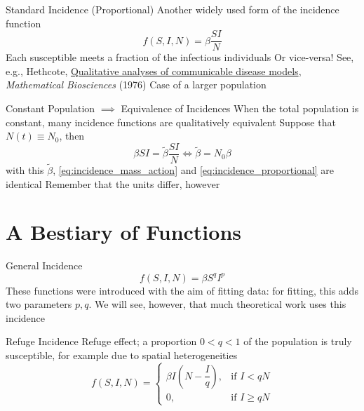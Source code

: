 \documentclass[aspectratio=169]{beamer}\usepackage[]{graphicx}\usepackage[]{xcolor}
\begin{document}
\begin{frame}{Standard Incidence (Proportional)}
\bbullet Another widely used form of the incidence function
\begin{equation}
\tag{3}\label{eq:incidence_proportional}
f(S,I,N)=\beta\frac{SI}{N}
\end{equation}
\bbullet Each susceptible meets a fraction of the infectious individuals
\vfill
\bbullet Or vice-versa! See, e.g., Hethcote, \href{https://doi-org.uml.idm.oclc.org/10.1016/0025-5564(76)90132-2}{Qualitative analyses of communicable disease models}, \emph{Mathematical Biosciences} (1976)
\vfill
\bbullet Case of a larger population
\end{frame}

\begin{frame}{Constant Population $\implies$ Equivalence of Incidences}
\bbullet When the total population is constant, many incidence functions are qualitatively equivalent 
\vfill
\bbullet Suppose that $N(t)\equiv N_0$, then
\[
\beta SI = \tilde\beta\frac{SI}{N}
\iff \tilde\beta=N_0\beta
\]
with this $\tilde\beta$, \eqref{eq:incidence_mass_action} and \eqref{eq:incidence_proportional} are identical
\vfill
\bbullet Remember that the units differ, however
\end{frame}

\section{A Bestiary of Functions}

\begin{frame}{General Incidence}
\begin{equation}
\tag{4}
f(S,I,N)=\beta S^q I^p
\end{equation}
\bbullet These functions were introduced with the aim of fitting data: for fitting, this adds two parameters $p,q$. We will see, however, that much theoretical work uses this incidence
\end{frame}

\begin{frame}{Refuge Incidence}
\bbullet Refuge effect; a proportion $0<q<1$ of the population is truly susceptible, for example due to spatial heterogeneities
\begin{equation}
\tag{5}
f(S,I,N)=
\begin{cases}
\beta I\left(N-\dfrac{I}{q}\right),&\textrm{if }I<qN \\
0,&\textrm{if }I\geq qN
\end{cases}
\end{equation}
\end{frame}
\end{document}
